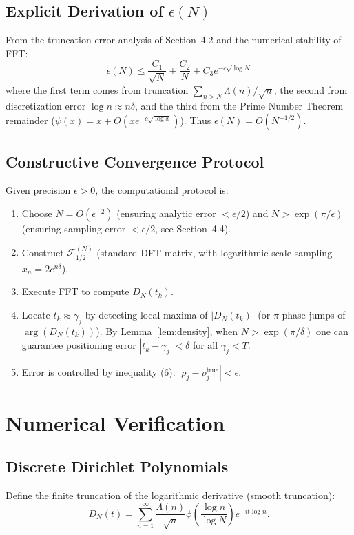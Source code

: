 \documentclass[12pt,a4paper]{amsart}
\theoremstyle{plain}
\theoremstyle{definition}
\theoremstyle{remark}
\begin{document}
\subsection{Explicit Derivation of $\epsilon(N)$}

From the truncation-error analysis of Section~4.2 and the numerical stability of FFT:
\[
\epsilon(N) \leq \frac{C_1}{\sqrt{N}} + \frac{C_2}{N} + C_3 e^{-c\sqrt{\log N}}
\]
where the first term comes from truncation $\sum_{n>N} \Lambda(n)/\sqrt{n}$, the second from discretization error $\log n \approx n\delta$, and the third from the Prime Number Theorem remainder ($\psi(x)=x+O(xe^{-c\sqrt{\log x}})$). Thus $\epsilon(N) = O(N^{-1/2})$.

\subsection{Constructive Convergence Protocol}

Given precision $\epsilon > 0$, the computational protocol is:

\begin{enumerate}
\item Choose $N = O(\epsilon^{-2})$ (ensuring analytic error $<\epsilon/2$) and $N > \exp(\pi/\epsilon)$ (ensuring sampling error $<\epsilon/2$, see Section~4.4).
\item Construct $\mathcal{F}_{1/2}^{(N)}$ (standard DFT matrix, with logarithmic-scale sampling $x_n = 2e^{n\delta}$).
\item Execute FFT to compute $D_N(t_k)$.
\item Locate $t_k \approx \gamma_j$ by detecting local maxima of $|D_N(t_k)|$ (or $\pi$ phase jumps of $\arg(D_N(t_k))$). By Lemma~\ref{lem:density}, when $N > \exp(\pi/\delta)$ one can guarantee positioning error $|t_k - \gamma_j| < \delta$ for all $\gamma_j < T$.
\item Error is controlled by inequality (6): $|\rho_j - \rho_j^{\mathrm{true}}| < \epsilon$.
\end{enumerate}

\section{Numerical Verification}

\subsection{Discrete Dirichlet Polynomials}

Define the finite truncation of the logarithmic derivative (smooth truncation):
\[
D_N(t)=\sum_{n=1}^\infty \frac{\Lambda(n)}{\sqrt{n}}\phi\left(\frac{\log n}{\log N}\right) e^{-it\log n}.
\]
\end{document}
